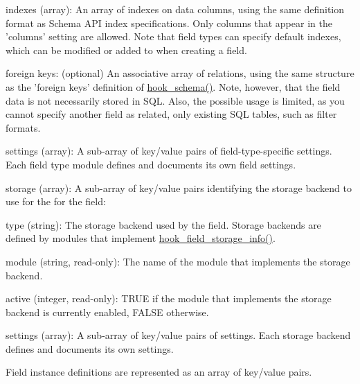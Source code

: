 \begin{DoxyItemize}
\item indexes (array): An array of indexes on data columns, using the same definition format as Schema API index specifications. Only columns that appear in the 'columns' setting are allowed. Note that field types can specify default indexes, which can be modified or added to when creating a field.
\item foreign keys: (optional) An associative array of relations, using the same structure as the 'foreign keys' definition of \hyperlink{group__schemaapi_ga9abd926ddaf68a22e6dca28a25d0c6f5}{hook\_\-schema()}. Note, however, that the field data is not necessarily stored in SQL. Also, the possible usage is limited, as you cannot specify another field as related, only existing SQL tables, such as filter formats.
\item settings (array): A sub-\/array of key/value pairs of field-\/type-\/specific settings. Each field type module defines and documents its own field settings.
\item storage (array): A sub-\/array of key/value pairs identifying the storage backend to use for the for the field:
\begin{DoxyItemize}
\item type (string): The storage backend used by the field. Storage backends are defined by modules that implement \hyperlink{group__field__storage_gadc5bfde3133504e946bb0aae8babe6f3}{hook\_\-field\_\-storage\_\-info()}.
\item module (string, read-\/only): The name of the module that implements the storage backend.
\item active (integer, read-\/only): TRUE if the module that implements the storage backend is currently enabled, FALSE otherwise.
\item settings (array): A sub-\/array of key/value pairs of settings. Each storage backend defines and documents its own settings.
\end{DoxyItemize}
\end{DoxyItemize}

Field instance definitions are represented as an array of key/value pairs.

